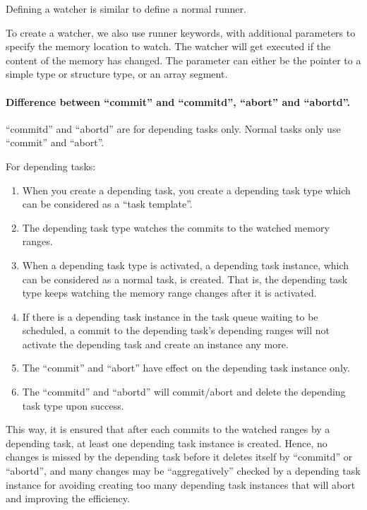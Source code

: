 \documentclass[a4paper]{article}
\DeclareRobustCommand{\mybox}[2][gray!20]{%
\begin{tcolorbox}[   %
        breakable,
        left=0pt,
        right=0pt,
        top=0pt,
        bottom=0pt,
        colback=#1,
        colframe=#1,
        width=\dimexpr\textwidth\relax, 
        enlarge left by=0mm,
        boxsep=5pt,
        arc=0pt,outer arc=0pt,
        ]
        #2
\end{tcolorbox}
}
\begin{document}
Defining a watcher is similar to define a normal runner.

To create a watcher, we also use runner keywords, with additional parameters to specify the memory location to watch. The watcher will get executed if the content of the memory has changed. The parameter can either be the pointer to a simple type or structure type, or an array segment.

{\mybox[gray!20]{{}}}

\paragraph{Difference between ``commit'' and ``commitd'', ``abort'' and ``abortd''.} ``commitd'' and ``abortd'' are for depending tasks only. Normal tasks only use ``commit'' and ``abort''.

For depending tasks:

\begin{enumerate}
\item When you create a depending task, you create a depending task type which can be considered as a ``task template''.
\item The depending task type watches the commits to the watched memory ranges.
\item When a depending task type is activated, a depending task instance, which can be considered as a normal task, is created. That is, the depending task type keeps watching the memory range changes after it is activated.
\item If there is a depending task instance in the task queue waiting to be scheduled, a commit to the depending task's depending ranges will not activate the depending task and create an instance any more.
\item The ``commit'' and ``abort'' have effect on the depending task instance only.
\item The ``commitd'' and ``abortd'' will commit/abort and delete the depending task type upon success.
\end{enumerate}

This way, it is ensured that after each commits to the watched ranges by a depending task, at least one depending task instance is created. Hence, no changes is missed by the depending task before it deletes itself by ``commitd'' or ``abortd'', and many changes may be ``aggregatively'' checked by a depending task instance for avoiding creating too many depending task instances that will abort and improving the efficiency.
\end{document}
